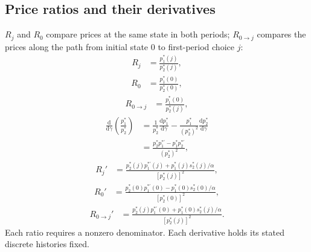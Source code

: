 \documentclass[11pt]{article}
\newcommand{\dd}{\mathrm{d}}
\begin{document}
\subsection{Price ratios and their derivatives}
$R_j$ and $R_0$ compare prices at the same state in both periods;
$R_{0\to j}$ compares the prices along the path from initial state $0$ to
first-period choice $j$:
\begin{equation}
\begin{aligned}
R_j&=\frac{p_1^*(j)}{p_2^*(j)},
\end{aligned}
\end{equation}
\begin{equation}
\begin{aligned}
R_0&=\frac{p_1^*(0)}{p_2^*(0)},
\end{aligned}
\end{equation}
\begin{equation}
\begin{aligned}
R_{0\to j}&=\frac{p_1^*(0)}{p_2^*(j)},
\end{aligned}
\end{equation}
\begin{equation}
\begin{aligned}
\frac{\dd}{\dd\gamma}\left(\frac{p_1^*}{p_2^*}\right)&=\frac1{p_2^*}\frac{\dd p_1^*}{\dd\gamma}
 -\frac{p_1^*}{(p_2^*)^2}\frac{\dd p_2^*}{\dd\gamma}\\[3pt]
&=\frac{p_2^*p_1^{*\prime}-p_1^*p_2^{*\prime}}{(p_2^*)^2},
\end{aligned}
\end{equation}
\begin{equation}
\begin{aligned}
R_j'&=\frac{p_2^*(j)p_1^{*\prime}(j)+p_1^*(j)s_2^*(j)/\alpha}{[p_2^*(j)]^2},
\end{aligned}
\end{equation}
\begin{equation}
\begin{aligned}
R_0'&=\frac{p_2^*(0)p_1^{*\prime}(0)-p_1^*(0)s_2^*(0)/\alpha}{[p_2^*(0)]^2},
\end{aligned}
\end{equation}
\begin{equation}
\begin{aligned}
R_{0\to j}'&=\frac{p_2^*(j)p_1^{*\prime}(0)+p_1^*(0)s_2^*(j)/\alpha}{[p_2^*(j)]^2}.
\end{aligned}
\end{equation}
Each ratio requires a nonzero denominator. Each derivative holds its stated discrete histories fixed.
\end{document}

